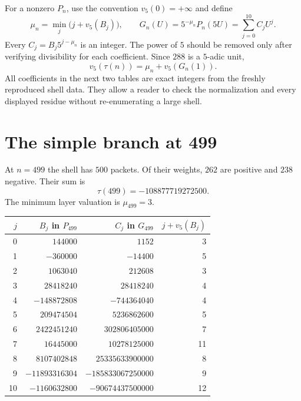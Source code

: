 For a nonzero $P_n$, use the convention $v_5(0)=+\infty$ and define
\[
 \mu_n=\min_j\bigl(j+v_5(B_j)\bigr),\qquad
 G_n(U)=5^{-\mu_n}P_n(5U)=\sum_{j=0}^{10}C_jU^j.
\]
Every $C_j=B_j5^{j-\mu_n}$ is an integer. The power of $5$ should be removed only after verifying divisibility for each coefficient. Since $288$ is a $5$-adic unit,
\begin{equation}
 v_5(\tau(n))=\mu_n+v_5(G_n(1)).
 \label{eq:workbook-normalized-valuation}
\end{equation}
All coefficients in the next two tables are exact integers from the freshly reproduced shell data. They allow a reader to check the normalization and every displayed residue without re-enumerating a large shell.

\section{The simple branch at 499}
\label{sec:workbook-499}

At $n=499$ the shell has $500$ packets. Of their weights, $262$ are positive and $238$ negative. Their sum is
\[
 \tau(499)=-108877719272500.
\]
The minimum layer valuation is $\mu_{499}=3$.

\begin{center}
\begingroup\small
\setlength{\tabcolsep}{5pt}
\begin{tabular}{r r r r}
\toprule
$j$ & $B_j$ in $P_{499}$ & $C_j$ in $G_{499}$ & $j+v_5(B_j)$\\
\midrule
0 & $144000$ & $1152$ & 3\\
1 & $-360000$ & $-14400$ & 5\\
2 & $1063040$ & $212608$ & 3\\
3 & $28418240$ & $28418240$ & 4\\
4 & $-148872808$ & $-744364040$ & 4\\
5 & $209474504$ & $5236862600$ & 5\\
6 & $2422451240$ & $302806405000$ & 7\\
7 & $16445000$ & $10278125000$ & 11\\
8 & $8107402848$ & $25335633900000$ & 8\\
9 & $-11893316304$ & $-185833067250000$ & 9\\
10 & $-1160632800$ & $-90674437500000$ & 12\\
\bottomrule
\end{tabular}
\endgroup
\end{center}

